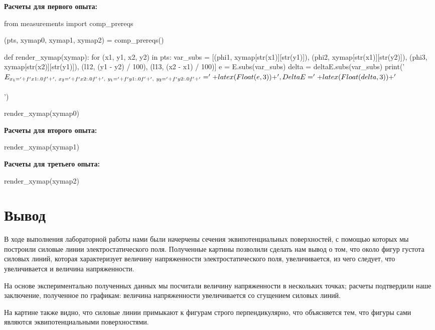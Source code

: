 \documentclass[12pt, a4paper]{article}
\begin{document}
\noindent\textbf{Расчеты для первого опыта:}\\

\noindent
\begin{sympycode}
from measurements import comp_prereqs

(pts, xymap0, xymap1, xymap2) = comp_prereqs()

def render_xymap(xymap):
  for (x1, y1, x2, y2) in pts:
    var_subs = [(phi1, xymap[str(x1)][str(y1)]),
                (phi2, xymap[str(x1)][str(y2)]),
                (phi3, xymap[str(x2)][str(y1)]),
                (l12, (y1 - y2) / 100),
                (l13, (x2 - x1) / 100)]
    e = E.subs(var_subs)
    delta = deltaE.subs(var_subs)
    print('$E_{x_1 = ' + f'{x1:.0f}' + ',\ x_2 = ' + f'{x2:.0f}' + ',\ y_1 = ' + f'{y1:.0f}' + ',\ y_2 = ' + f'{y2:.0f}' + '} = '
          + latex(Float(e, 3)) + ',\ \\Delta E = ' + latex(Float(delta, 3)) + '$\\\\')

render_xymap(xymap0)
\end{sympycode}

\noindent\textbf{Расчеты для второго опыта:}\\

\noindent
\begin{sympycode}
render_xymap(xymap1)
\end{sympycode}

\noindent\textbf{Расчеты для третьего опыта:}\\

\noindent
\begin{sympycode}
render_xymap(xymap2)
\end{sympycode}

\section*{Вывод}

В ходе выполнения лабораторной работы нами были начерчены сечения
эквипотенциальных поверхностей, с помощью которых мы построили силовые линии
электростатического поля. Полученные картины позволили сделать нам вывод о том,
что около фигур густота силовых линий, которая характеризует величину напряженности
электростатического поля, увеличивается, из чего следует, что увеличивается и
величина напряженности.

На основе экспериментально полученных данных мы посчитали величину напряженности
в нескольких точках; расчеты подтвердили наше заключение, полученное по графикам:
величина напряженности увеличивается со сгущением силовых линий.

На картине также видно, что силовые линии примыкают к фигурам строго перпендикулярно,
что объясняется тем, что фигуры сами являются эквипотенциальными поверхностями.
\end{document}
